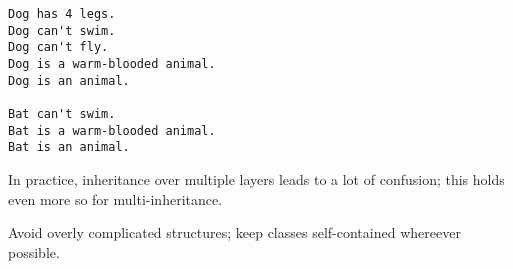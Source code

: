 \begin{frame}[fragile]
%
\begin{tcbraster}[raster columns=2,
                  raster equal height,
                  nobeforeafter,
                  raster column skip=0.5cm]
\begin{cmdbox}
\begin{verbatim}
Dog has 4 legs.
Dog can't swim.
Dog can't fly.
Dog is a warm-blooded animal.
Dog is an animal.

Bat can't swim.
Bat is a warm-blooded animal.
Bat is an animal.
\end{verbatim}
\end{cmdbox}
%
\begin{hintbox}
In practice, inheritance over multiple layers leads to a lot of confusion; this holds even more so for multi-inheritance.

Avoid overly complicated structures; keep classes self-contained whereever possible.
\end{hintbox}
\end{tcbraster}
%
\end{frame}